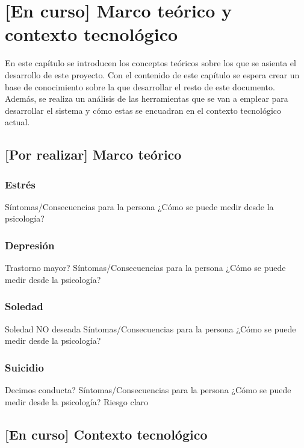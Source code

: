 \chapter{[En curso] Marco teórico y contexto tecnológico}
\label{chapter:marco_teorico}


En este capítulo se introducen los conceptos teóricos sobre los que se asienta el desarrollo de este proyecto. Con el contenido de este capítulo se espera crear un base de conocimiento sobre la que desarrollar el resto de este documento. Además, se realiza un análisis de las herramientas que se van a emplear para desarrollar el sistema y cómo estas se encuadran en el contexto tecnológico actual.

\section{[Por realizar] Marco teórico}
    
    \subsection{Estrés}
        Síntomas/Consecuencias para la persona
        ¿Cómo se puede medir desde la psicología?
    \subsection{Depresión}
        Trastorno mayor?
        Síntomas/Consecuencias para la persona
        ¿Cómo se puede medir desde la psicología?
    \subsection{Soledad}
        Soledad NO deseada
        Síntomas/Consecuencias para la persona
        ¿Cómo se puede medir desde la psicología?
    \subsection{Suicidio}
        Decimos conducta?
        Síntomas/Consecuencias para la persona
        ¿Cómo se puede medir desde la psicología? Riesgo claro
        
\section{[En curso] Contexto tecnológico}

